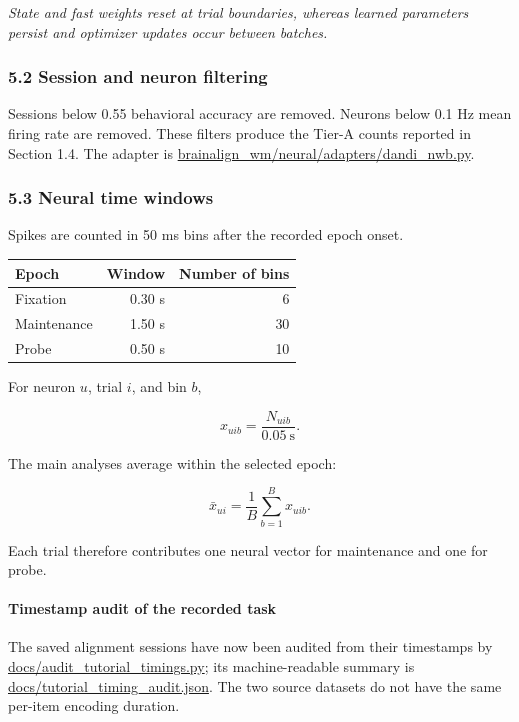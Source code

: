 \documentclass[
  10pt,
]{article}
\begin{document}
\emph{State and fast weights reset at trial boundaries, whereas learned
parameters persist and optimizer updates occur between batches.}

\hypertarget{session-and-neuron-filtering}{%
\subsubsection{5.2 Session and neuron
filtering}\label{session-and-neuron-filtering}}

Sessions below 0.55 behavioral accuracy are removed. Neurons below 0.1
Hz mean firing rate are removed. These filters produce the Tier-A counts
reported in Section 1.4. The adapter is
\url{brainalign_wm/neural/adapters/dandi_nwb.py}.

\hypertarget{neural-time-windows}{%
\subsubsection{5.3 Neural time windows}\label{neural-time-windows}}

Spikes are counted in 50 ms bins after the recorded epoch onset.

\begin{longtable}[]{@{}lrr@{}}
\toprule\noalign{}
Epoch & Window & Number of bins \\
\midrule\noalign{}
\endhead
\bottomrule\noalign{}
\endlastfoot
Fixation & 0.30 s & 6 \\
Maintenance & 1.50 s & 30 \\
Probe & 0.50 s & 10 \\
\end{longtable}

For neuron \(u\), trial \(i\), and bin \(b\),

\[
x_{uib}=\frac{N_{uib}}{0.05\ \mathrm{s}}.
\]

The main analyses average within the selected epoch:

\[
\bar x_{ui}=\frac{1}{B}\sum_{b=1}^{B}x_{uib}.
\]

Each trial therefore contributes one neural vector for maintenance and
one for probe.

\hypertarget{timestamp-audit-of-the-recorded-task}{%
\paragraph{Timestamp audit of the recorded
task}\label{timestamp-audit-of-the-recorded-task}}

The saved alignment sessions have now been audited from their timestamps
by \url{docs/audit_tutorial_timings.py}; its machine-readable summary is
\url{docs/tutorial_timing_audit.json}. The two source datasets do not
have the same per-item encoding duration.
\end{document}
